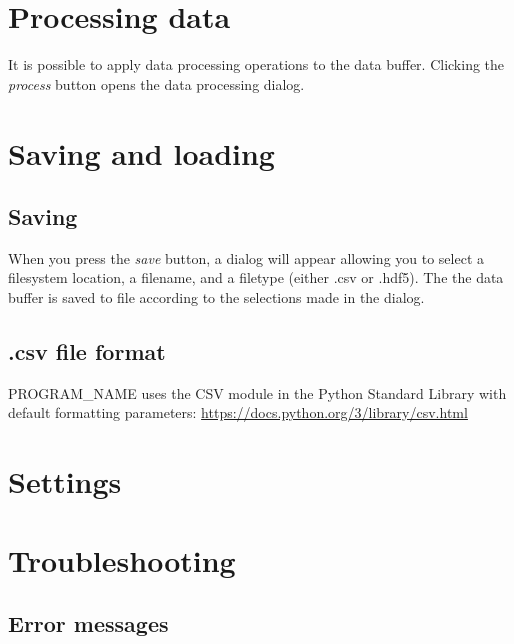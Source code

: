\documentclass[11pt,letterpaper,article,oneside]{memoir}
\newcommand{\name}{PROGRAM\_NAME}
\begin{document}
\section{Processing data}

It is possible to apply data processing operations to the data buffer. Clicking
the \emph{process} button opens the data processing dialog.

\section{Saving and loading}

\subsection{Saving}

When you press the \emph{save} button, a dialog will appear allowing you to
select a filesystem location, a filename, and a filetype (either .csv or .hdf5).
The the data buffer is saved to file according to the selections made in the
dialog.


\label{sec:savingloading}

\subsection{.csv file format}
\label{sec:csv}
\name{} uses the CSV module in the Python Standard Library
with default formatting parameters:
\url{https://docs.python.org/3/library/csv.html}

\section{Settings}

\section{Troubleshooting}

\subsection{Error messages}
\end{document}
